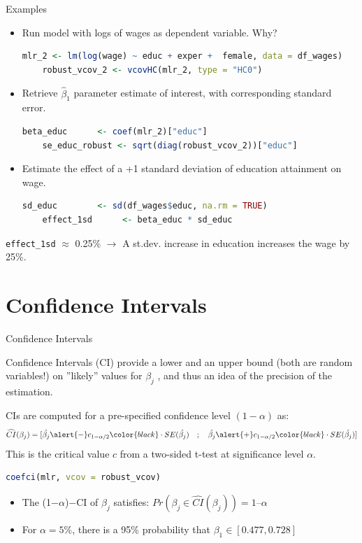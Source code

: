 \documentclass[11pt, aspectratio = 169]{beamer}
\begin{document}
\begin{frame}[fragile]{Examples}

\begin{itemize}
    \item Run model with logs of wages as dependent variable. Why?
    \begin{lstlisting}[language=R]
    mlr_2 <- lm(log(wage) ~ educ + exper +  female, data = df_wages)
    robust_vcov_2 <- vcovHC(mlr_2, type = "HC0")
    \end{lstlisting}
    \item Retrieve $\hat{\beta}_1$ parameter estimate of interest, with corresponding standard error.
    \begin{lstlisting}[language=R]
    beta_educ      <- coef(mlr_2)["educ"]
    se_educ_robust <- sqrt(diag(robust_vcov_2))["educ"]
    \end{lstlisting}
    \item Estimate the effect of a +1 standard deviation of education attainment on wage.
    \begin{lstlisting}[language=R]
    sd_educ        <- sd(df_wages$educ, na.rm = TRUE)
    effect_1sd      <- beta_educ * sd_educ
    \end{lstlisting}
\end{itemize}
\pause
    \texttt{effect\_1sd} $\approx$ 0.25\% $\rightarrow$ A st.dev. increase in education increases the wage by 25\%.
\end{frame}

\section{Confidence Intervals}

\begin{frame}[fragile]{Confidence Intervals}

\begin{block}{Confidence Intervals (CI)}
    provide a lower and an upper bound (both are random variables!) on ''likely'' values for $\beta_j$ , and thus an idea of the precision of the estimation.
\end{block}
\pause
CIs  are computed for a pre-specified confidence level $(1-\alpha)$ as:
$$\widehat{CI}(\beta_j) = [\hat{\beta_j}\alert{-}c_{1-\alpha/2}\color{black} \cdot SE(\hat{\beta_j}) \quad ; \quad \hat{\beta_j}\alert{+} c_{1-\alpha/2}\color{black}\cdot SE(\hat{\beta_j})]$$
\pause
This is the critical value $c$ from a two-sided t-test at significance level $\alpha$.
\begin{lstlisting}[language=R]
    coefci(mlr, vcov = robust_vcov)
\end{lstlisting}
\pause
\begin{itemize}
    \item The (1$-\alpha$)$-$CI of $\beta_j$ satisfies:  $Pr(\beta_j \in \widehat{CI}(\beta_j) ) = 1 – \alpha$
    \item[$\rightarrow$] For $\alpha=5\%$, there is a 95\% probability that $\beta_1 \in [0.477, 0.728]$ 
\end{itemize}
\end{frame}
\end{document}
